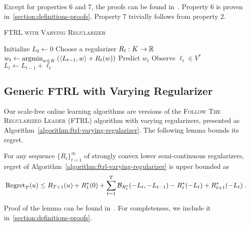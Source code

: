 Except for properties 6 and 7, the proofs can be found
in~\cite{Shalev-Shwartz-2007}.  Property 6 is proven
in~\ref{section:definitions-proofs}. Property 7 trivially follows from property
2.

\begin{algorithm}[t]
\caption{\textsc{FTRL with Varying Regularizer}}
\label{algorithm:ftrl-varying-regularizer}
\begin{algorithmic}[1]
\STATE Initialize $L_0 \leftarrow 0$
\STATE Choose a regularizer $R_t:K \to \mathbb{R}$
\STATE $w_t \leftarrow \operatorname*{argmin}_{w \in K} \left( \langle L_{t-1}, w \rangle + R_t(w) \right)$
\STATE Predict $w_t$
\STATE Observe $\ell_t \in V^*$
\STATE $L_t \leftarrow L_{t-1} + \ell_t$
\ENDFOR
\end{algorithmic}
\end{algorithm}

\subsection{Generic FTRL with Varying Regularizer}
\label{section:generic-ftrl}

Our scale-free online learning algorithms are versions of the \textsc{Follow
The Regularized Leader} (FTRL) algorithm with varying regularizers, presented
as Algorithm~\ref{algorithm:ftrl-varying-regularizer}.  The following lemma
bounds its regret.

\begin{lemma}
\label{lemma:generic-regret-bound}
For any sequence $\{R_t\}_{t=1}^\infty$ of strongly convex lower
semi-continuous regularizers, regret of
Algorithm~\ref{algorithm:ftrl-varying-regularizer} is upper
bounded as
$$
\operatorname{Regret}_T(u) \le R_{T+1}(u) + R_1^*(0) + \sum_{t=1}^{T} \mathcal{B}_{R_t^*}(-L_t, -L_{t-1}) - R_t^*(-L_t) + R_{t+1}^*(-L_t) \; .
$$
\end{lemma}

Proof of the lemma can be found in~\cite{Orabona-Crammer-Cesa-Bianchi-2014}. For completeness,
we include it in~\ref{section:definitions-proofs}.
